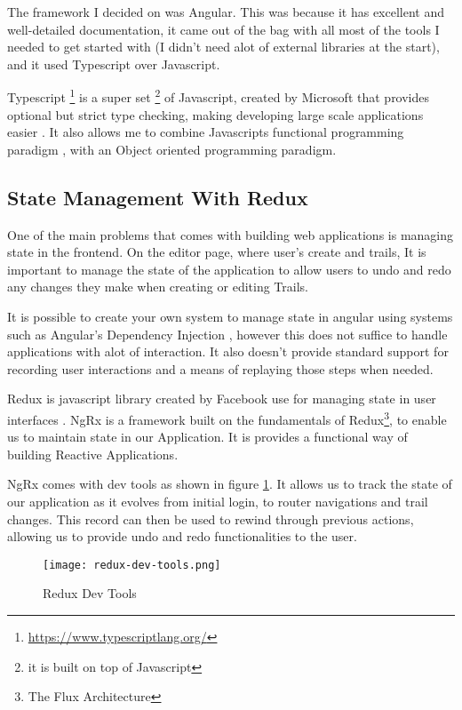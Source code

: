 The framework I decided on was Angular. This was because it has excellent and well-detailed documentation, it came out of the bag with all most of the tools I needed to get started with (I didn't need alot of external libraries at the start), and it used Typescript over Javascript.

Typescript \footnote{\url{https://www.typescriptlang.org/}} is a super set \footnote{it is built on top of Javascript} of Javascript, created by Microsoft that provides optional but strict type checking, making developing large scale applications easier \cite{bierman2014understanding}. It also allows me to combine Javascripts functional programming paradigm \cite{hughes1989functional}, with an Object oriented programming paradigm.

\subsection{State Management With Redux}
One of the main problems that comes with building web applications is managing state in the frontend. On the editor page, where user's create and trails, It is important to manage the state of the application to allow users to undo and redo any changes they make when creating or editing Trails.

It is possible to create your own system to manage state in angular using systems such as Angular's Dependency Injection \cite{wiki:DependencyInjection}, however this does not suffice to handle applications with alot of interaction. It also doesn't provide standard support for recording user interactions and a means of replaying those steps when needed.

Redux is javascript library created by Facebook use for managing state in user interfaces \cite{wiki:Redux}. NgRx \cite{cheng2018state} is a framework built on the fundamentals of Redux\footnote{The Flux Architecture}, to enable us to maintain state in our Application. It is provides a functional way of building Reactive Applications.

NgRx comes with dev tools as shown in figure \ref{fig:reduxDevTools}. It allows us to track the state of our application as it evolves from initial login, to router navigations and trail changes. This record can then be used to rewind through previous actions, allowing us to provide undo and redo functionalities to the user.
\begin{figure}[ht]
    \centering
    \texttt{[image: redux-dev-tools.png]}
    \caption{Redux Dev Tools}
    \label{fig:reduxDevTools}
\end{figure}

